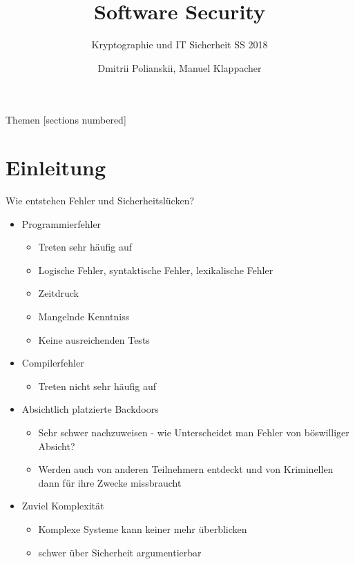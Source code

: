 \documentclass[10pt]{beamer}
\title{Software Security}
\subtitle{Kryptographie und IT Sicherheit SS 2018}
\date{}
\author{Dmitrii Polianskii, Manuel Klappacher}
\institute{Universit\"at Salzburg}
\begin{document}
\maketitle

\begin{frame}{Themen}
  [sections numbered]
  \tableofcontents
\end{frame}


\section{Einleitung}

\begin{frame}[fragile]{Wie entstehen Fehler und Sicherheitsl\"ucken?}
  \begin{itemize}
    \item Programmierfehler
      \begin{itemize}
        \item Treten sehr h\"aufig auf
        \item Logische Fehler, syntaktische Fehler, lexikalische Fehler
        \item Zeitdruck
        \item Mangelnde Kenntniss
        \item Keine ausreichenden Tests
      \end{itemize}
    \item Compilerfehler
      \begin{itemize}
        \item Treten nicht sehr h\"aufig auf
      \end{itemize}
    \item Absichtlich platzierte Backdoors
      \begin{itemize}
        \item Sehr schwer nachzuweisen - wie Unterscheidet man Fehler von b\"oswilliger Absicht?
        \item Werden auch von anderen Teilnehmern entdeckt und von Kriminellen dann f\"ur ihre Zwecke missbraucht
      \end{itemize}
    \item Zuviel Komplexit\"at
      \begin{itemize}
        \item Komplexe Systeme kann keiner mehr \"uberblicken
        \item schwer \"uber Sicherheit argumentierbar
      \end{itemize}
  \end{itemize}
\end{frame}
\end{document}
